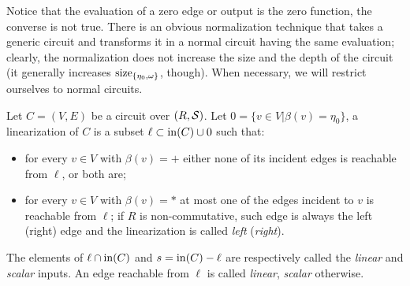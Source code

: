 Notice that the evaluation of a zero edge or output is the zero
function, the converse is not true.  There is an obvious normalization
technique that takes a generic circuit and transforms it in a normal
circuit having the same evaluation; clearly, the normalization does
not increase the size and the depth of the circuit (it generally
increases $\operatorname{size}_{\{\eta_0,\omega\}}$, though). When necessary, we
will restrict ourselves to normal circuits.

\begin{definition}[Linearization]
  Let $C=(V,E)$ be a circuit over $(R, \mathcal{S})$. Let $0=\{v\in
  V|\beta(v)=\eta_0\}$, a linearization of $C$ is a subset
  $\ell\subset\operatorname{in}(C)\cup 0$ such that:
  \begin{itemize}
  \item for every $v\in V$ with $\beta(v)=+$ either none of its
    incident edges is reachable from $\ell$, or both are;
  \item for every $v\in V$ with $\beta(v)=*$ at most one of the edges
    incident to $v$ is reachable from $\ell$; if $R$ is
    non-commutative, such edge is always the left (right) edge and the
    linearization is called \emph{left} (\emph{right}).
  \end{itemize}
  The elements of $\ell\cap\operatorname{in}(C)$ and $s = \operatorname{in}(C) - \ell$ are
  respectively called the \emph{linear} and \emph{scalar} inputs. An
  edge reachable from $\ell$ is called \emph{linear}, \emph{scalar}
  otherwise.
\end{definition}


